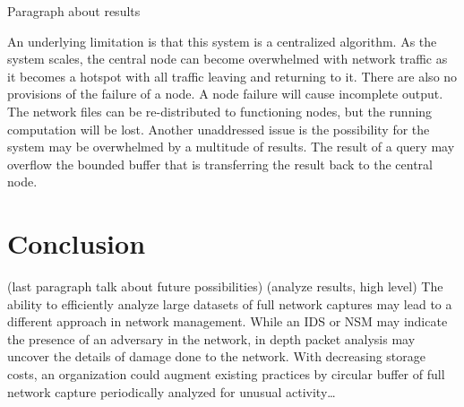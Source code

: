 \documentclass{article}
\begin{document}
\begin{multicols}{2}
Paragraph about results


An underlying limitation is that this system is a centralized algorithm. As the system scales, the central node can become overwhelmed with network traffic as it becomes a hotspot with all traffic leaving and returning to it. There are also no provisions of the failure of a node.  A node failure will cause incomplete output.  The network files can be re-distributed to functioning nodes, but the running computation will be lost.  Another unaddressed issue is the possibility for the system may be overwhelmed by a multitude of results. The result of a query may overflow the bounded buffer that is transferring the result back to the central node. 


\section{Conclusion}

(last paragraph talk about future possibilities)
(analyze results, high level)
The ability to efficiently analyze large datasets of full network captures may lead to a different approach in network management.  While an IDS or NSM may indicate the presence of an adversary in the network, in depth packet analysis may uncover the details of damage done to the network.  With decreasing storage costs, an organization could augment existing practices by circular buffer of full network capture periodically analyzed for unusual activity…

\end{multicols}
\end{document}
